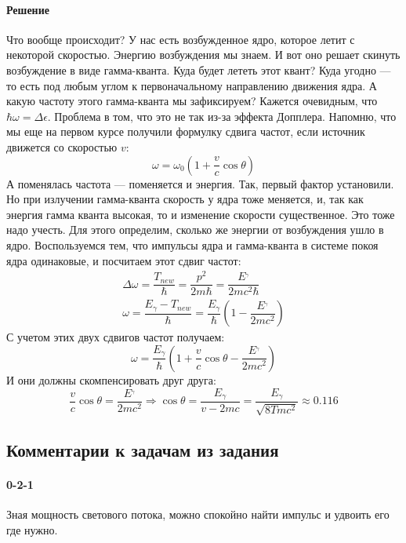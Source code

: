 \documentclass[12pt]{article}
\begin{document}
\paragraph{Решение} Что вообще происходит? У нас есть возбужденное ядро, которое летит с некоторой скоростью. Энергию возбуждения мы знаем. И вот оно решает скинуть возбуждение в виде гамма-кванта. Куда будет лететь этот квант? Куда угодно --- то есть под любым углом к первоначальному направлению движения ядра. А какую частоту этого гамма-кванта мы зафиксируем? Кажется очевидным, что $\hbar\omega = \Delta \epsilon$. Проблема в том, что это не так из-за эффекта Допплера. Напомню, что мы еще на первом курсе получили формулку сдвига частот, если источник движется со скоростью $v$:
\begin{equation*}
    \omega = \omega_0 \left(1+ \dfrac{v}{c}\cos{\theta} \right)
\end{equation*}
А поменялась частота --- поменяется и энергия. Так, первый фактор установили. Но при излучении гамма-кванта скорость у ядра тоже меняется, и, так как энергия гамма кванта высокая, то и изменение скорости существенное. Это тоже надо учесть. Для этого определим, сколько же энергии от возбуждения ушло в ядро. Воспользуемся тем, что импульсы ядра и гамма-кванта в системе покоя ядра одинаковые, и посчитаем этот сдвиг частот:
\begin{gather*}
    \Delta\omega = \dfrac{T_{new}}{\hbar} =  \dfrac{p^2}{2m\hbar} = \dfrac{E^_{\gamma}}{2mc^2\hbar}\\
    \omega = \dfrac{E_{\gamma} - T_{new}}{\hbar} = \dfrac{E_{\gamma}}{\hbar} \left(1-\dfrac{E^_{\gamma}}{2mc^2} \right)
\end{gather*}
С учетом этих двух сдвигов частот получаем:
\begin{equation*}
    \omega = \dfrac{E_{\gamma}}{\hbar} \left(1+ \dfrac{v}{c}\cos{\theta} - \dfrac{E^_{\gamma}}{2mc^2}\right)
\end{equation*}
И они должны скомпенсировать друг друга:
\begin{equation*}
    \dfrac{v}{c}\cos{\theta} = \dfrac{E^_{\gamma}}{2mc^2} \Rightarrow \cos{\theta} = \dfrac{E_\gamma}{v-2mc} = \dfrac{E_\gamma}{\sqrt{8Tmc^2}} \approx 0.116
\end{equation*}


\subsection{Комментарии к задачам из задания}
\paragraph{0-2-1} Зная мощность светового потока, можно спокойно найти импульс и удвоить его где нужно.
\end{document}
